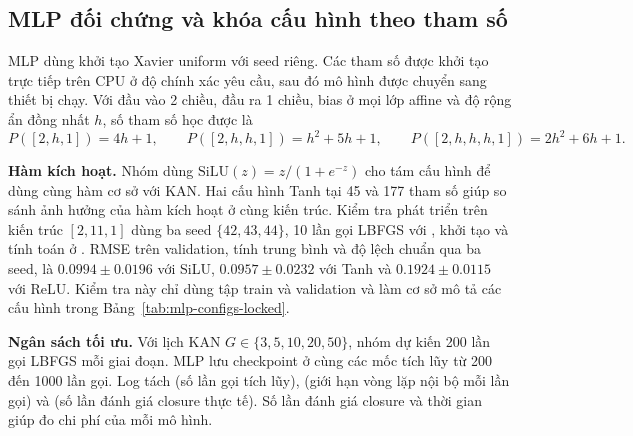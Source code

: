 \subsection{MLP đối chứng và khóa cấu hình theo tham số}
MLP dùng khởi tạo Xavier uniform với seed riêng. Các tham số được khởi tạo trực tiếp trên CPU ở độ chính xác yêu cầu, sau đó mô hình được chuyển sang thiết bị chạy. Với đầu vào 2 chiều, đầu ra 1 chiều, bias ở mọi lớp affine và độ rộng ẩn đồng nhất $h$, số tham số học được là
\begin{equation}\label{eq:mlp-params}
P([2,h,1]) = 4h+1, \qquad P([2,h,h,1]) = h^2+5h+1, \qquad P([2,h,h,h,1]) = 2h^2+6h+1.
\end{equation}

\textbf{Hàm kích hoạt.} Nhóm dùng $\mathrm{SiLU}(z) = z/(1+e^{-z})$ cho tám cấu hình để dùng cùng hàm cơ sở với KAN. Hai cấu hình Tanh tại 45 và 177 tham số giúp so sánh ảnh hưởng của hàm kích hoạt ở cùng kiến trúc. Kiểm tra phát triển trên kiến trúc $[2,11,1]$ dùng ba seed $\{42,43,44\}$, 10 lần gọi LBFGS với , khởi tạo và tính toán ở . RMSE trên validation, tính trung bình và độ lệch chuẩn qua ba seed, là $0.0994 \pm 0.0196$ với SiLU, $0.0957 \pm 0.0232$ với Tanh và $0.1924 \pm 0.0115$ với ReLU. Kiểm tra này chỉ dùng tập train và validation và làm cơ sở mô tả các cấu hình trong Bảng~\ref{tab:mlp-configs-locked}.

\textbf{Ngân sách tối ưu.} Với lịch KAN $G\in\{3,5,10,20,50\}$, nhóm dự kiến 200 lần gọi LBFGS mỗi giai đoạn. MLP lưu checkpoint ở cùng các mốc tích lũy từ 200 đến 1000 lần gọi. Log tách  (số lần gọi tích lũy),  (giới hạn vòng lặp nội bộ mỗi lần gọi) và  (số lần đánh giá closure thực tế). Số lần đánh giá closure và thời gian giúp đo chi phí của mỗi mô hình.

